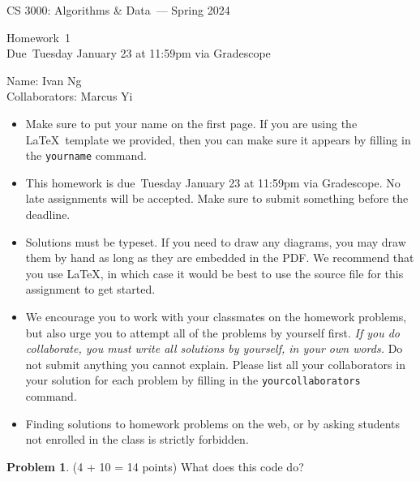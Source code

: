 \documentclass[11pt]{article}
\newcommand{\yourname}{Ivan Ng}
\newcommand{\yourcollaborators}{Marcus Yi}
\theoremstyle{definition}
\theoremstyle{theorem}
\newtheorem{prob}{Problem}
\newcommand{\course}{CS 3000: Algorithms \& Data}
\newcommand{\semester}{Spring 2024}
\newcommand{\hwnum}{1}
\newcommand{\hwdue}{Tuesday January 23 at 11:59pm via Gradescope}
\begin{document}
{\Large 
\begin{center} \course\ --- \semester\ \end{center}}
{\large
\vspace{10pt}
\noindent Homework~\hwnum \vspace{2pt}\\
Due~\hwdue}

\vspace{15pt}
\bigskip
{\large
\noindent Name: \yourname \vspace{2pt}\\ Collaborators: \yourcollaborators}

\vspace{15pt}
\begin{itemize}

\item
  Make sure to put your name on the first page.  If you are using the
  \LaTeX~template we provided, then you can make sure it appears by
  filling in the \texttt{yourname} command.

\item This homework is due~\hwdue.  No late assignments will be accepted.  Make sure to submit something before the deadline.

\item Solutions must be typeset.  If you need to draw any diagrams,
  you may draw them by hand as long as they are embedded in the PDF.
  We recommend that you use \LaTeX, in which case it would be best to
  use the source file for this assignment to get started.

\item We encourage you to work with your classmates on the homework
  problems, but also urge you to attempt all of the problems by
  yourself first. \emph{If you do collaborate, you must write all
    solutions by yourself, in your own words.}  Do not submit anything
  you cannot explain.  Please list all your collaborators in your
  solution for each problem by filling in the
  \texttt{yourcollaborators} command.

\item Finding solutions to homework problems on the web, or by asking
  students not enrolled in the class is strictly forbidden.

\end{itemize}
\newpage

\begin{prob}
  \label{prob:mystery}
(4 + 10 = 14 points)  What does this code do?
\end{prob}
\end{document}
